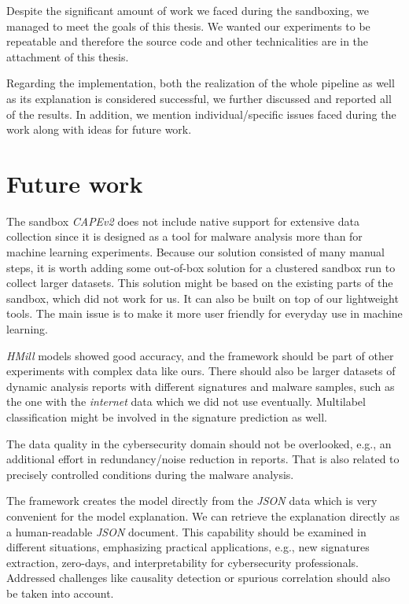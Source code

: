 Despite the significant amount of work we faced during the sandboxing, we managed to meet the goals of this thesis. We wanted our experiments to be repeatable and therefore the source code and other technicalities are in the attachment of this thesis.

Regarding the implementation, both the realization of the whole pipeline as well as its explanation is considered successful, we further discussed and reported all of the results. In addition, we mention individual/specific issues faced during the work along with ideas for future work.

\section*{Future work}
The sandbox \emph{CAPEv2} does not include native support for extensive data collection since it is designed as a tool for malware analysis more than for machine learning experiments. Because our solution consisted of many manual steps, it is worth adding some out-of-box solution for a clustered sandbox run to collect larger datasets. This solution might be based on the existing parts of the sandbox, which did not work for us. It can also be built on top of our lightweight tools. The main issue is to make it more user friendly for everyday use in machine learning.

\emph{HMill} models showed good accuracy, and the framework should be part of other experiments with complex data like ours. There should also be larger datasets of dynamic analysis reports with different signatures and malware samples, such as the one with the \emph{internet} data which we did not use eventually. Multilabel classification might be involved in the signature prediction as well. 

The data quality in the cybersecurity domain should not be overlooked, e.g., an additional effort in redundancy/noise reduction in reports. That is also related to precisely controlled conditions during the malware analysis.

The framework creates the model directly from the \emph{JSON} data which is very convenient for the model explanation. We can retrieve the explanation directly as a human-readable \emph{JSON} document. This capability should be examined in different situations, emphasizing practical applications, e.g., new signatures extraction, zero-days, and interpretability for cybersecurity professionals.  Addressed challenges like causality detection or spurious correlation should also be taken into account.

